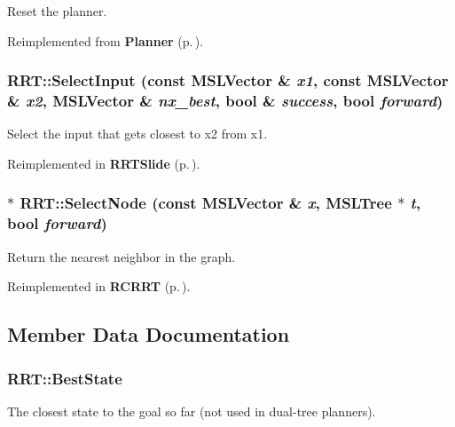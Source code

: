 Reset the planner.



Reimplemented from {\bf Planner} {\rm (p.\,\pageref{classPlanner_a2})}.
\subsubsection{ RRT::Select\-Input (const {\bf MSLVector} \& {\em x1}, const {\bf MSLVector} \& {\em x2}, {\bf MSLVector} \& {\em nx\_\-best}, bool \& {\em success}, bool {\em forward})\hspace{0.3cm}{\tt  [protected, virtual]}}\label{classRRT_b0}


Select the input that gets closest to x2 from x1.



Reimplemented in {\bf RRTSlide} {\rm (p.\,\pageref{classRRTSlide_a2})}.
\subsubsection{ $\ast$ RRT::Select\-Node (const {\bf MSLVector} \& {\em x}, {\bf MSLTree} $\ast$ {\em t}, bool {\em forward})\hspace{0.3cm}{\tt  [protected, virtual]}}\label{classRRT_b1}


Return the nearest neighbor in the graph.



Reimplemented in {\bf RCRRT} {\rm (p.\,\pageref{classRCRRT_a6})}.

\subsection{Member Data Documentation}
\subsubsection{ RRT::Best\-State}\label{classRRT_m2}


The closest state to the goal so far (not used in dual-tree planners).

